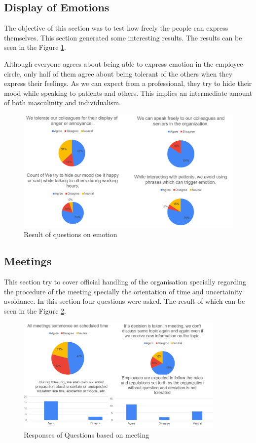 \documentclass{article}
\begin{document}
\subsection{Display of Emotions}

The objective of this section was to test how freely the people can express themselves. This section generated some interesting results. The results can be seen in the Figure \ref{Emotion}.

Although everyone agrees about being able to express emotion in the employee circle, only half of them agree about being tolerant of the others when they express their feelings. As we can expect from a professional, they try to hide their mood while speaking to patients and others. This implies an intermediate amount of both masculinity and individualism.

\begin{figure}
    \centering
    \includegraphics[width = 4.5 in]{Emotion.png}
    \caption{Result of questions on emotion}
    \label{Emotion}
\end{figure}

\subsection{Meetings}

This section try to cover official handling of the organisation specially regarding the procedure of the meeting specially the orientation of time and uncertainity avoidance. In this section four questions were asked. The result of which can be seen in the Figure \ref{meeting}.

\begin{figure}
    \begin{center}
        \includegraphics[width = 4in]{Meeting.png}
    \end{center}
    \caption{Responses of Questions based on meeting}
    \label{meeting}
\end{figure}
\end{document}
